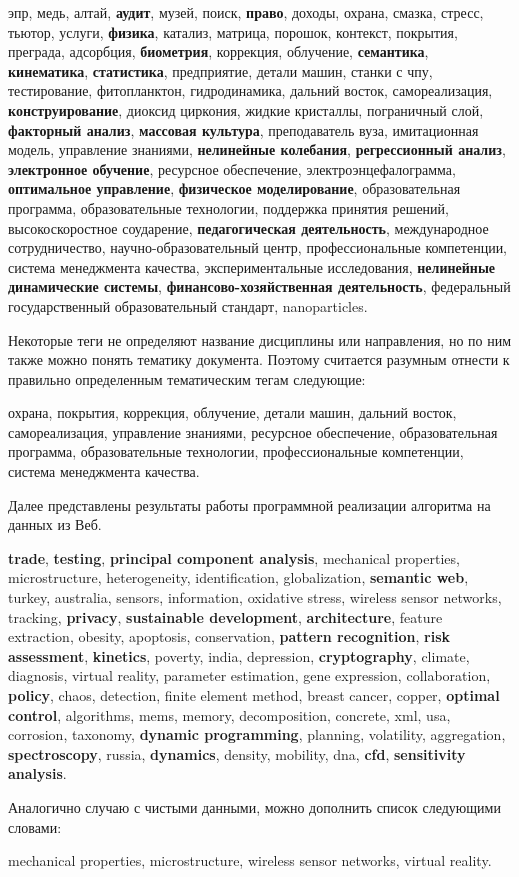 эпр, медь, алтай, \textbf{аудит}, музей, поиск, \textbf{право}, доходы, охрана, смазка, стресс, тьютор, услуги, \textbf{физика}, катализ, матрица, порошок, контекст, покрытия, преграда, адсорбция, \textbf{биометрия}, коррекция, облучение, \textbf{семантика}, \textbf{кинематика}, \textbf{статистика}, предприятие, детали машин, станки с чпу, тестирование, фитопланктон, гидродинамика, дальний восток, самореализация, \textbf{конструирование}, диоксид циркония, жидкие кристаллы, пограничный слой, \textbf{факторный анализ}, \textbf{массовая культура}, преподаватель вуза, имитационная модель, управление знаниями, \textbf{нелинейные колебания}, \textbf{регрессионный анализ}, \textbf{электронное обучение}, ресурсное обеспечение, электроэнцефалограмма, \textbf{оптимальное управление}, \textbf{физическое моделирование}, образовательная программа, образовательные технологии, поддержка принятия решений, высокоскоростное соударение, \textbf{педагогическая деятельность}, международное сотрудничество, научно-образовательный центр, профессиональные компетенции, система менеджмента качества, экспериментальные исследования, \textbf{нелинейные динамические системы}, \textbf{финансово-хозяйственная деятельность}, федеральный государственный образовательный стандарт, nanoparticles.

Некоторые теги не определяют название дисциплины или направления, но по ним также можно понять тематику документа. Поэтому считается разумным отнести к правильно определенным тематическим тегам следующие:

охрана, покрытия, коррекция, облучение, детали машин, дальний восток, самореализация, управление знаниями, ресурсное обеспечение, образовательная программа, образовательные технологии, профессиональные компетенции, система менеджмента качества.

Далее представлены результаты работы программной реализации алгоритма на данных из Веб.

\textbf{trade}, \textbf{testing}, \textbf{principal component analysis}, mechanical properties, microstructure, heterogeneity, identification, globalization, \textbf{semantic web}, turkey, australia, sensors, information, oxidative stress, wireless sensor networks, tracking, \textbf{privacy}, \textbf{sustainable development}, \textbf{architecture}, feature extraction, obesity, apoptosis, conservation, \textbf{pattern recognition}, \textbf{risk assessment}, \textbf{kinetics}, poverty, india, depression, \textbf{cryptography}, climate, diagnosis, virtual reality, parameter estimation, gene expression, collaboration, \textbf{policy}, chaos, detection, finite element method, breast cancer, copper, \textbf{optimal control}, algorithms, mems, memory, decomposition, concrete, xml, usa, corrosion, taxonomy, \textbf{dynamic programming}, planning, volatility, aggregation, \textbf{spectroscopy}, russia, \textbf{dynamics}, density, mobility, dna, \textbf{cfd}, \textbf{sensitivity analysis}.

Аналогично случаю с чистыми данными, можно дополнить список следующими словами:

mechanical properties, microstructure, wireless sensor networks, virtual reality.
